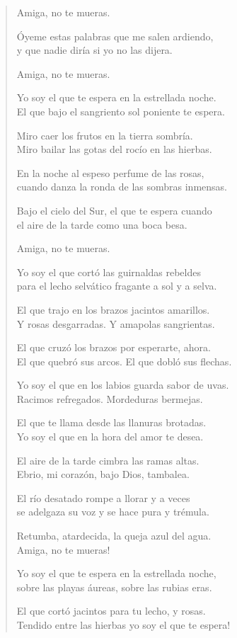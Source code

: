 \documentclass[12pt]{article}
\begin{document}
\clearpage
{}
\begin{verse}

Amiga, no te mueras.  

Óyeme estas palabras que me salen ardiendo,\\
y que nadie diría si yo no las dijera.  

Amiga, no te mueras.  

Yo soy el que te espera en la estrellada noche.\\
El que bajo el sangriento sol poniente te espera.  

Miro caer los frutos en la tierra sombría.\\
Miro bailar las gotas del rocío en las hierbas.  

En la noche al espeso perfume de las rosas,\\
cuando danza la ronda de las sombras inmensas.  

Bajo el cielo del Sur, el que te espera cuando\\
el aire de la tarde como una boca besa.  

Amiga, no te mueras.  

Yo soy el que cortó las guirnaldas rebeldes\\
para el lecho selvático fragante a sol y a selva.  

El que trajo en los brazos jacintos amarillos.\\
Y rosas desgarradas. Y amapolas sangrientas.  

El que cruzó los brazos por esperarte, ahora.\\
El que quebró sus arcos. El que dobló sus flechas.  

Yo soy el que en los labios guarda sabor de uvas.\\
Racimos refregados. Mordeduras bermejas.  

El que te llama desde las llanuras brotadas.\\
Yo soy el que en la hora del amor te desea.  

El aire de la tarde cimbra las ramas altas.\\
Ebrio, mi corazón, bajo Dios, tambalea.  

El río desatado rompe a llorar y a veces\\
se adelgaza su voz y se hace pura y trémula.  

Retumba, atardecida, la queja azul del agua.\\
Amiga, no te mueras!  

Yo soy el que te espera en la estrellada noche,\\
sobre las playas áureas, sobre las rubias eras.  

El que cortó jacintos para tu lecho, y rosas.\\
Tendido entre las hierbas yo soy el que te espera!

\end{verse}
\end{document}
